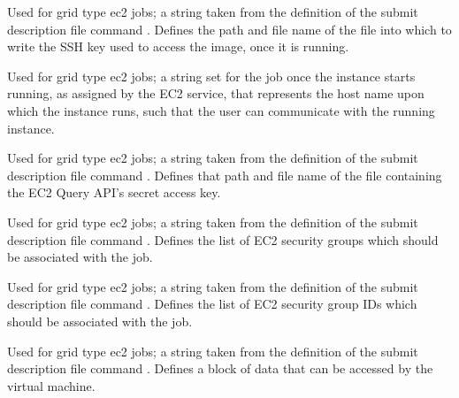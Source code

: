 \begin{description}
\item[\AdAttr{EC2KeyPairFile}:] 
Used for grid type ec2 jobs;
a string taken from the definition of the submit description file command
.
Defines the path and file name of the file 
into which to write the SSH key used to access the image, once it is running. 

\item[\AdAttr{EC2RemoteVirtualMachineName}:] 
Used for grid type ec2 jobs;
a string set for the job once the instance starts running, 
as assigned by the EC2 service, that represents
the host name upon which the instance runs, such that the
user can communicate with the running instance.

\item[\AdAttr{EC2SecretAccessKey}:] 
Used for grid type ec2 jobs;
a string taken from the definition of the submit description file command
.
Defines that path and file name of the file 
containing the EC2 Query API's secret access key.

\item[\AdAttr{EC2SecurityGroups}:] 
Used for grid type ec2 jobs;
a string taken from the definition of the submit description file command
.
Defines the list of EC2 security groups which should be associated with the job.

\item[\AdAttr{EC2SecurityIDs}:] 
Used for grid type ec2 jobs;
a string taken from the definition of the submit description file command
.
Defines the list of EC2 security group IDs which should be associated with the job.

\item[\AdAttr{EC2UserData}:] 
Used for grid type ec2 jobs;
a string taken from the definition of the submit description file command
.
Defines a block of data that can be accessed by the virtual machine.


\end{description}
